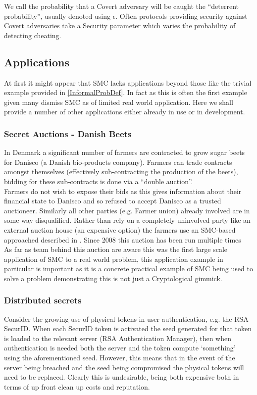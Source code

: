 \documentclass[a4paper,11pt]{article}
\begin{document}
				We call the probability that a Covert adversary will be caught the ``deterrent probability'', usually denoted using $\epsilon$. Often protocols providing security against Covert adversaries take a Security parameter which varies the probability of detecting cheating.


		\subsection{Applications} \label{Applications}
			At first it might appear that SMC lacks applications beyond those like the trivial example provided in \ref{InformalProbDef}. In fact as this is often the first example given many dismiss SMC as of limited real world application. Here we shall provide a number of other applications either already in use or in development.


			\subsubsection{Secret Auctions - Danish Beets} \label{BeetsAuctionApplication}
				In Denmark a significant number of farmers are contracted to grow sugar beets for Danisco (a Danish bio-products company). Farmers can trade contracts amongst themselves (effectively sub-contracting the production of the beets), bidding for these sub-contracts is done via a ``double auction''.\\

				Farmers do not wish to expose their bids as this gives information about their financial state to Danisco and so refused to accept Danisco as a trusted auctioneer. Similarly all other parties (e.g. Farmer union) already involved are in some way disqualified. Rather than rely on a completely uninvolved party like an external auction house (an expensive option) the farmers use an SMC-based approached described in \cite{SugarBeets}. Since 2008 this auction has been run multiple times \\

				As far as team behind this auction are aware this was the first large scale application of SMC to a real world problem, this application example in particular is important as it is a concrete practical example of SMC being used to solve a problem demonstrating this is not just a Cryptological gimmick.

			\subsubsection{Distributed secrets} \label{DistributedSecretApplication}
				Consider the growing use of physical tokens in user authentication, e.g. the RSA SecurID. When each SecurID token is activated the seed generated for that token is loaded to the relevant server (RSA Authentication Manager), then when authentication is needed both the server and the token compute `something' using the aforementioned seed. However, this means that in the event of the server being breached and the seed being compromised the physical tokens will need to be replaced. Clearly this is undesirable, being both expensive both in terms of up front clean up costs and reputation.\\
\end{document}
